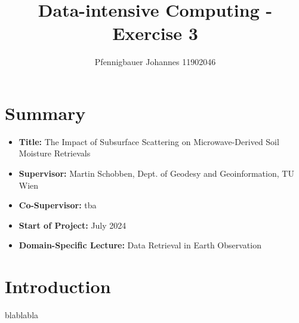 \documentclass[12pt]{article}
\title{Data-intensive Computing - Exercise 3}
\author{Pfennigbauer Johannes 11902046}
\begin{document}
\maketitle

\section{Summary}
\begin{itemize}[label=]
    \item \textbf{Title:} The Impact of Subsurface Scattering on Microwave-Derived Soil Moisture Retrievals
    \item \textbf{Supervisor:} Martin Schobben, Dept. of Geodesy and Geoinformation, TU Wien
    \item \textbf{Co-Supervisor:} tba
    \item \textbf{Start of Project:} July 2024
    \item \textbf{Domain-Specific Lecture:} Data Retrieval in Earth Observation
\end{itemize}

\section{Introduction}

blablabla \cite{Morrison2020}
\end{document}
